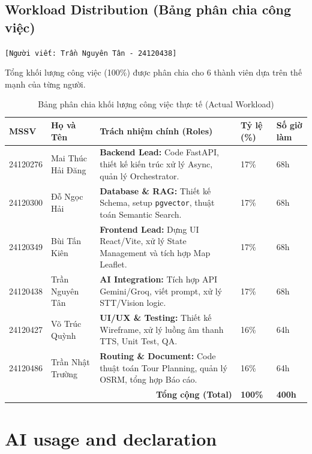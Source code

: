 \subsection{Workload Distribution (Bảng phân chia công việc)}
\texttt{[Người viết: Trần Nguyên Tân - 24120438]}

Tổng khối lượng công việc (100\%) được phân chia cho 6 thành viên dựa trên thế mạnh của từng người. 

\begin{table}[H]
    \centering
    \renewcommand{\arraystretch}{1.4}
    \begin{tabular}{|p{2cm}|p{4cm}|p{6cm}|p{1.5cm}|p{1.5cm}|}
        \hline
        \textbf{MSSV} & \textbf{Họ và Tên} & \textbf{Trách nhiệm chính (Roles)} & \textbf{Tỷ lệ (\%)} & \textbf{Số giờ làm} \\ \hline
        24120276 & Mai Thúc Hải Đăng & \textbf{Backend Lead:} Code FastAPI, thiết kế kiến trúc xử lý Async, quản lý Orchestrator. & 17\% & 68h \\ \hline
        24120300 & Đỗ Ngọc Hải & \textbf{Database \& RAG:} Thiết kế Schema, setup \texttt{pgvector}, thuật toán Semantic Search. & 17\% & 68h \\ \hline
        24120349 & Bùi Tấn Kiên & \textbf{Frontend Lead:} Dựng UI React/Vite, xử lý State Management và tích hợp Map Leaflet. & 17\% & 68h \\ \hline
        24120438 & Trần Nguyên Tân & \textbf{AI Integration:} Tích hợp API Gemini/Groq, viết prompt, xử lý STT/Vision logic. & 17\% & 68h \\ \hline
        24120427 & Võ Trúc Quỳnh & \textbf{UI/UX \& Testing:} Thiết kế Wireframe, xử lý luồng âm thanh TTS, Unit Test, QA. & 16\% & 64h \\ \hline
        24120486 & Trần Nhật Trường & \textbf{Routing \& Document:} Code thuật toán Tour Planning, quản lý OSRM, tổng hợp Báo cáo. & 16\% & 64h \\ \hline
        \multicolumn{3}{|r|}{\textbf{Tổng cộng (Total)}} & \textbf{100\%} & \textbf{400h} \\ \hline
    \end{tabular}
    \caption{Bảng phân chia khối lượng công việc thực tế (Actual Workload)}
\end{table}

\section{AI usage and declaration}

